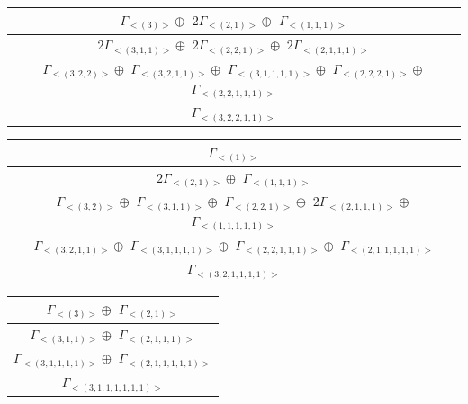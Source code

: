 \begin{minipage}{.6\textwidth}
\centering
\begin{tabular}{|c|}\hline
$\Gamma_{<(
3
)>} \oplus$
$ 2 \Gamma_{<(
2 , 
1
)>} \oplus$
$\Gamma_{<(
1 , 
1 , 
1
)>}$
\\ \hline
$ 2 \Gamma_{<(
3 , 
1 , 
1
)>} \oplus$
$ 2 \Gamma_{<(
2 , 
2 , 
1
)>} \oplus$
$ 2 \Gamma_{<(
2 , 
1 , 
1 , 
1
)>}$
\\ \hline
$\Gamma_{<(
3 , 
2 , 
2
)>} \oplus$
$\Gamma_{<(
3 , 
2 , 
1 , 
1
)>} \oplus$
$\Gamma_{<(
3 , 
1 , 
1 , 
1 , 
1
)>} \oplus$
$\Gamma_{<(
2 , 
2 , 
2 , 
1
)>} \oplus$
$\Gamma_{<(
2 , 
2 , 
1 , 
1 , 
1
)>}$
\\ \hline
$\Gamma_{<(
3 , 
2 , 
2 , 
1 , 
1
)>}$
\\
\hline\end{tabular}\end{minipage}
\bigskip
\begin{minipage}{.6\textwidth}
\centering
\begin{tabular}{|c|}\hline
$\Gamma_{<(
1
)>}$
\\ \hline
$ 2 \Gamma_{<(
2 , 
1
)>} \oplus$
$\Gamma_{<(
1 , 
1 , 
1
)>}$
\\ \hline
$\Gamma_{<(
3 , 
2
)>} \oplus$
$\Gamma_{<(
3 , 
1 , 
1
)>} \oplus$
$\Gamma_{<(
2 , 
2 , 
1
)>} \oplus$
$ 2 \Gamma_{<(
2 , 
1 , 
1 , 
1
)>} \oplus$
$\Gamma_{<(
1 , 
1 , 
1 , 
1 , 
1
)>}$
\\ \hline
$\Gamma_{<(
3 , 
2 , 
1 , 
1
)>} \oplus$
$\Gamma_{<(
3 , 
1 , 
1 , 
1 , 
1
)>} \oplus$
$\Gamma_{<(
2 , 
2 , 
1 , 
1 , 
1
)>} \oplus$
$\Gamma_{<(
2 , 
1 , 
1 , 
1 , 
1 , 
1
)>}$
\\ \hline
$\Gamma_{<(
3 , 
2 , 
1 , 
1 , 
1 , 
1
)>}$
\\
\hline\end{tabular}\end{minipage}
\begin{minipage}{.5\textwidth}
\centering
\begin{tabular}{|c|}\hline
$\Gamma_{<(
3
)>} \oplus$
$\Gamma_{<(
2 , 
1
)>}$
\\ \hline
$\Gamma_{<(
3 , 
1 , 
1
)>} \oplus$
$\Gamma_{<(
2 , 
1 , 
1 , 
1
)>}$
\\ \hline
$\Gamma_{<(
3 , 
1 , 
1 , 
1 , 
1
)>} \oplus$
$\Gamma_{<(
2 , 
1 , 
1 , 
1 , 
1 , 
1
)>}$
\\ \hline
$\Gamma_{<(
3 , 
1 , 
1 , 
1 , 
1 , 
1 , 
1
)>}$
\\
\hline\end{tabular}\end{minipage}
